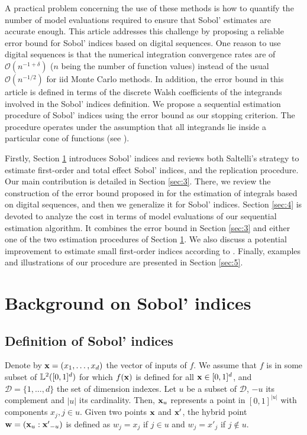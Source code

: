 A practical problem concerning the use of these methods is how to quantify the number of model evaluations required to ensure that Sobol' estimates are accurate enough. This article addresses this challenge by proposing a reliable error bound for Sobol' indices based on digital sequences. One reason to use digital sequences is that the numerical integration convergence rates are of $\mathcal{O}(n^{-1+\delta})$ ($n$ being the number of function values) instead of the usual $\mathcal{O}(n^{-1/2})$ for iid Monte Carlo methods. In addition, the error bound in this article is defined in terms of the discrete Walsh coefficients of the integrands involved in the Sobol' indices definition. We propose a sequential estimation procedure of Sobol' indices using the error bound as our stopping criterion. The procedure operates under the assumption that all integrands lie inside a particular cone of functions (see \cite{HicJim}).

Firstly, Section \ref{sec:2} introduces Sobol' indices and reviews both Saltelli's strategy to estimate first-order and total effect Sobol' indices, and the replication procedure. Our main contribution is detailed in  Section \ref{sec:3}. There, we review the construction of the error bound proposed in \cite{HicJim} for the estimation of integrals based on digital sequences, and then we generalize it for Sobol' indices. Section \ref{sec:4} is devoted to analyze the cost in terms of model evaluations of our sequential estimation algorithm. It combines the error bound in Section \ref{sec:3} and either one of the two estimation procedures of Section \ref{sec:2}. We also discuss a potential improvement to estimate small first-order indices according to \cite{Owen}. Finally, examples and illustrations of our procedure are presented in Section \ref{sec:5}. 

\section{Background on Sobol' indices}
\label{sec:2}

\subsection{Definition of Sobol' indices}
\label{sec:2.1}
Denote by $\boldsymbol{\mathbf{x}}=(x_1,\dots,x_d)$ the vector of inputs of $f$. We assume that $f$ is in some subset of $\mathbb{L}^2([0,1]^d)$ for which $f(\boldsymbol{\mathbf{x}})$ is defined for all $\boldsymbol{\mathbf{x}}\in[0,1]^d$, and $\mathcal{D}=\{1,\dots,d\}$ the set of dimension indexes. %
Let $u$ be a subset of $\mathcal{D}$, $-u$ its complement and $|u|$ its cardinality. Then, $\boldsymbol{\mathbf{x}}_u$ represents a point in $[0,1]^{|u|}$ with components $x_j, j \in u$. Given two points $\boldsymbol{\mathbf{x}}$ and $\boldsymbol{\mathbf{x}}'$, the hybrid point $\boldsymbol{\mathbf{w}}=(\boldsymbol{\mathbf{x}}_u:{\boldsymbol{\mathbf{x}}'}_{-u})$ is defined as $w_j=x_j$ if $j \in u$ and $w_j=x'_j$ if $j \notin u$.%


